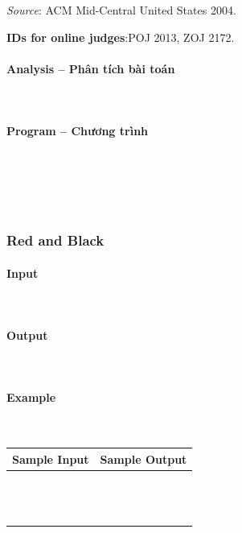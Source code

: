 \documentclass{article}
\begin{document}
\textit{Source}: ACM Mid-Central United States 2004.

\textbf{IDs for online judges}:POJ 2013, ZOJ 2172.

\paragraph{Analysis -- Phân tích bài toán} \mbox{} \\



\paragraph{Program -- Chương trình} \mbox{} \\


\begin{lstlisting}
	
	
\end{lstlisting}
\subsubsection{Red and Black}
 

\paragraph{Input} \mbox{} \\



\paragraph{Output}\mbox{} \\


\paragraph{Example}\mbox{} \\

\begin{table}[h]
    \centering
    \begin{tabular}{|l|r|}
        \hline
        \textbf{Sample Input} & \textbf{Sample Output} \\
        \hline
		&  \\ 
		&  \\ 
		&  \\ 
		&  \\ 
		&  \\
		&  \\ 
		&  \\ 
		&  \\ 
		&  \\ 
		&  \\ 
		&  \\ 
		&  \\
		&  \\ \hline
    \end{tabular}
\end{table}
\end{document}
